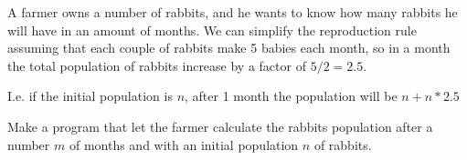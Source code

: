



\ExamNameLine
\ExamStandardBoxEn
A farmer owns a number of rabbits, and he wants to know how many rabbits he will have in an amount of
months. We can simplify the reproduction rule assuming that each
couple of rabbits make 5 babies each month, so in a month the total
population of rabbits increase by a factor of $5/2=2.5$.

I.e. if the
initial population is $n$, after 1 month the population will be
$n+n*2.5$

Make a program that let the farmer calculate the rabbits population
after a number $m$ of months and with an initial population $n$ of
rabbits.


